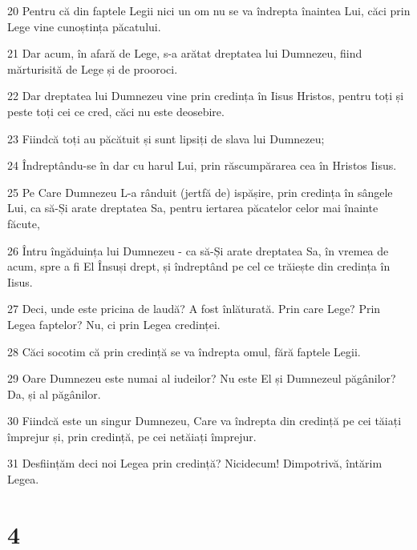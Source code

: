\par 20 Pentru că din faptele Legii nici un om nu se va îndrepta înaintea Lui, căci prin Lege vine cunoștința păcatului.
\par 21 Dar acum, în afară de Lege, s-a arătat dreptatea lui Dumnezeu, fiind mărturisită de Lege și de prooroci.
\par 22 Dar dreptatea lui Dumnezeu vine prin credința în Iisus Hristos, pentru toți și peste toți cei ce cred, căci nu este deosebire.
\par 23 Fiindcă toți au păcătuit și sunt lipsiți de slava lui Dumnezeu;
\par 24 Îndreptându-se în dar cu harul Lui, prin răscumpărarea cea în Hristos Iisus.
\par 25 Pe Care Dumnezeu L-a rânduit (jertfă de) ispășire, prin credința în sângele Lui, ca să-Și arate dreptatea Sa, pentru iertarea păcatelor celor mai înainte făcute,
\par 26 Întru îngăduința lui Dumnezeu - ca să-Și arate dreptatea Sa, în vremea de acum, spre a fi El Însuși drept, și îndreptând pe cel ce trăiește din credința în Iisus.
\par 27 Deci, unde este pricina de laudă? A fost înlăturată. Prin care Lege? Prin Legea faptelor? Nu, ci prin Legea credinței.
\par 28 Căci socotim că prin credință se va îndrepta omul, fără faptele Legii.
\par 29 Oare Dumnezeu este numai al iudeilor? Nu este El și Dumnezeul păgânilor? Da, și al păgânilor.
\par 30 Fiindcă este un singur Dumnezeu, Care va îndrepta din credință pe cei tăiați împrejur și, prin credință, pe cei netăiați împrejur.
\par 31 Desființăm deci noi Legea prin credință? Nicidecum! Dimpotrivă, întărim Legea.

\chapter{4}

